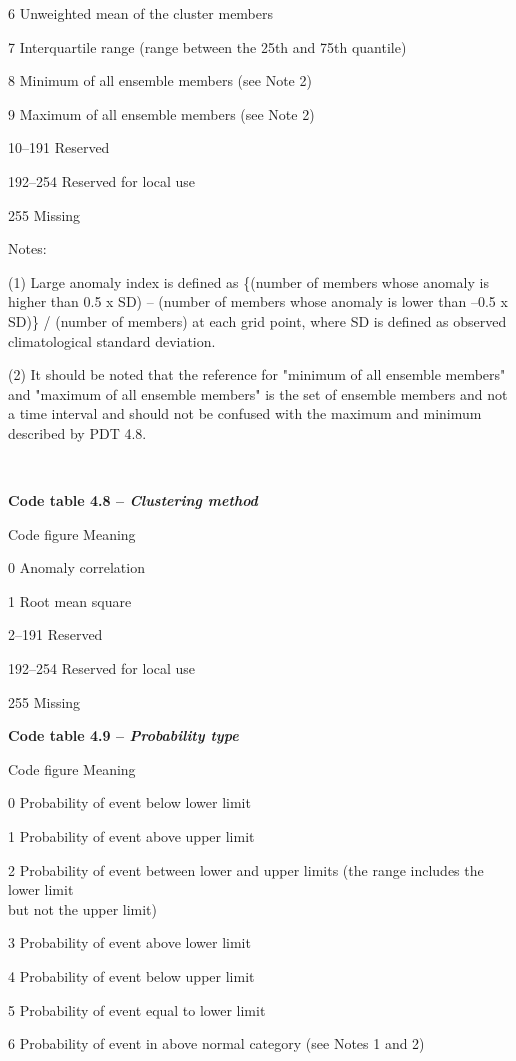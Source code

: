 6 Unweighted mean of the cluster members

7 Interquartile range (range between the 25th and 75th quantile)

8 Minimum of all ensemble members (see Note 2)

9 Maximum of all ensemble members (see Note 2)

10--191 Reserved

192--254 Reserved for local use

255 Missing

Notes:

(1) Large anomaly index is defined as \{(number of members whose anomaly is higher than 0.5 x SD) -- (number of members whose anomaly is lower than --0.5 x SD)\} / (number of members) at each grid point, where SD is defined as observed climatological standard deviation.

(2) It should be noted that the reference for "minimum of all ensemble members" and "maximum of all ensemble members" is the set of ensemble members and not a time interval and should not be confused with the maximum and minimum described by PDT 4.8.

\textbf{\\
}

\textbf{Code table 4.8 -- \emph{Clustering method}}

Code figure Meaning

0 Anomaly correlation

1 Root mean square

2--191 Reserved

192--254 Reserved for local use

255 Missing

\textbf{Code table 4.9 -- \emph{Probability type}}

Code figure Meaning

0 Probability of event below lower limit

1 Probability of event above upper limit

2 Probability of event between lower and upper limits (the range includes the lower limit\\
but not the upper limit)

3 Probability of event above lower limit

4 Probability of event below upper limit

5 Probability of event equal to lower limit

6 Probability of event in above normal category (see Notes 1 and 2)

